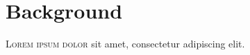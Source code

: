 \chapter{Background}
\lettrine[lines=4, loversize=-0.1, lraise=0.1]{L}{orem ipsum dolor} sit amet, consectetur adipiscing elit.
